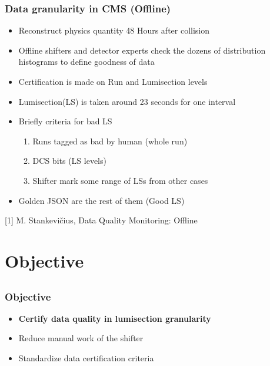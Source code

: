 \documentclass{beamer}
\begin{document}

\begin{frame}
\frametitle{Data granularity in CMS (Offline)}
\begin{itemize}
    \item Reconstruct physics quantity 48 Hours after collision 
    \item Offline shifters and detector experts check the dozens of distribution histograms to define goodness of data
    \item Certification is made on Run and Lumisection levels
    \item Lumisection(LS) is taken around 23 seconds for one interval
    \item Briefly criteria for bad LS
    \begin{enumerate}
        \item Runs tagged as bad by human (whole run)
        \item DCS bits (LS levels)
        \item Shifter mark some range of LSs from other cases
    \end{enumerate}
    \item Golden JSON are the rest of them (Good LS)
\end{itemize}
\vspace{0.4in}\tiny [1] M. Stankevičius, Data Quality Monitoring: Offline
\end{frame}

\section{Objective} %
\subsection{}

\begin{frame}
\frametitle{Objective}
\begin{itemize}
    \item \textbf{Certify data quality in lumisection granularity}
    \item Reduce manual work of the shifter
    \item Standardize data certification criteria
\end{itemize}
\end{frame}
\end{document}
